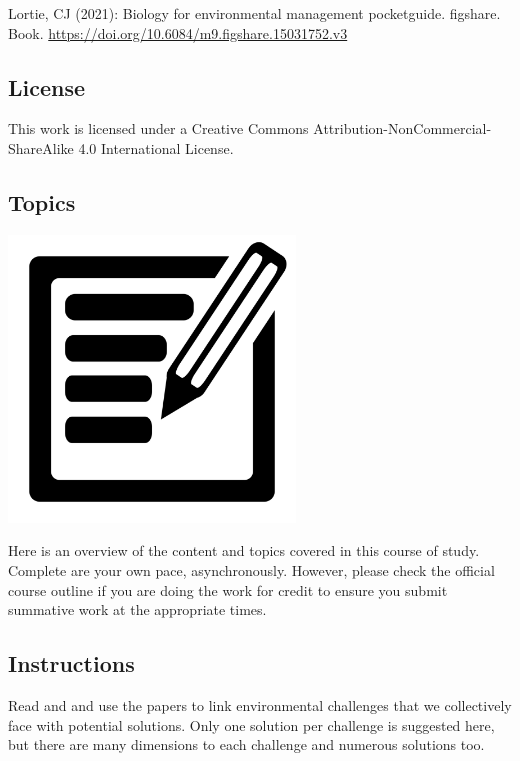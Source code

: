 \documentclass[
]{book}
\begin{document}
Lortie, CJ (2021): Biology for environmental management pocketguide. figshare. Book. \url{https://doi.org/10.6084/m9.figshare.15031752.v3}

\hypertarget{license}{%
\subsection*{License}\label{license}}

This work is licensed under a Creative Commons Attribution-NonCommercial-ShareAlike 4.0 International License.

\hypertarget{topics}{%
\subsection*{Topics}\label{topics}}

\includegraphics[width=3in,height=\textheight]{./outline.png}

Here is an overview of the content and topics covered in this course of study. Complete are your own pace, asynchronously. However, please check the official course outline if you are doing the work for credit to ensure you submit summative work at the appropriate times.

\hypertarget{instructions}{%
\subsection*{Instructions}\label{instructions}}

Read and and use the papers to link environmental challenges that we collectively face with potential solutions. Only one solution per challenge is suggested here, but there are many dimensions to each challenge and numerous solutions too.
\end{document}
